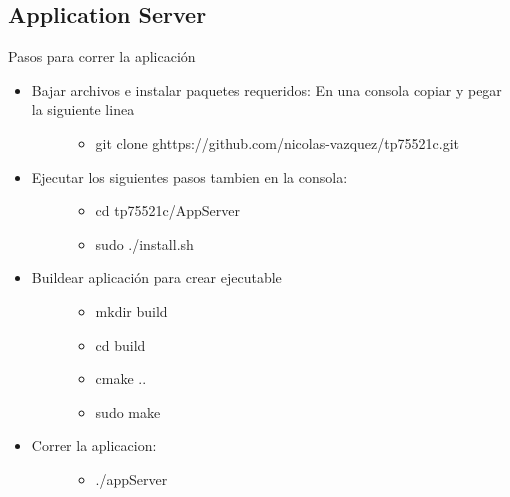 \documentclass[letterpaper,10pt,english]{sphinxmanual}
\begin{document}
\subsection{Application Server}
\label{manuals:application-server}
Pasos para correr la aplicación
\begin{itemize}
\item {} \begin{description}
\item[{Bajar archivos e instalar paquetes requeridos: En una consola copiar y pegar la siguiente linea}] \leavevmode\begin{itemize}
\item {} 
git clone ghttps://github.com/nicolas-vazquez/tp75521c.git

\end{itemize}

\end{description}

\item {} \begin{description}
\item[{Ejecutar los siguientes pasos tambien en la consola:}] \leavevmode\begin{itemize}
\item {} 
cd tp75521c/AppServer

\item {} 
sudo ./install.sh

\end{itemize}

\end{description}

\item {} \begin{description}
\item[{Buildear aplicación para crear ejecutable}] \leavevmode\begin{itemize}
\item {} 
mkdir build

\item {} 
cd build

\item {} 
cmake ..

\item {} 
sudo make

\end{itemize}

\end{description}

\item {} \begin{description}
\item[{Correr la aplicacion:}] \leavevmode\begin{itemize}
\item {} 
./appServer

\end{itemize}

\end{description}

\end{itemize}
\end{document}
